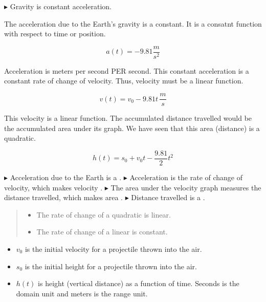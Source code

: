 \documentclass{ximera}
\begin{document}
$\blacktriangleright$ Gravity is constant acceleration.

The acceleration due to the Earth's gravity is a constant.  It is a consatnt function with respect to time or position.


\[ a(t) = -9.81 \frac{m}{s^2}  \]



Acceleration is meters per second PER second.  This constant acceleration is a constant rate of change of velocity.  Thus, velocity must be a linear function.




\[ v(t) = v_0 - 9.81 t  \, \frac{m}{s}\]



This velocity is a linear function. The accumulated distance travelled would be the accumulated area under its graph. We have seen that this area (distance) is a quadratic. 




\[ h(t) = s_0 + v_0 t - \frac{9.81}{2} t^2  \]

$\blacktriangleright$ Acceleration due to the Earth is a  .
$\blacktriangleright$ Acceleration is the rate of change of velocity, which makes velocity  .
$\blacktriangleright$ The area under the velocity graph measures the distance travelled, which makes area  .
$\blacktriangleright$ Distance travelled is a  .



\begin{quote}
\begin{itemize}
\item The rate of change of a quadratic is linear.
\item The rate of change of a linear is constant.
\end{itemize}
\end{quote}


\begin{itemize}
\item $v_0$ is the initial velocity for a projectile thrown into the air. \\

\item $s_0$ is the initial height for a projectile thrown into the air. \\

\item $h(t)$ is height (vertical distance) as a function of time.  Seconds is the domain unit and meters is the range unit.
\end{itemize}
\end{document}
